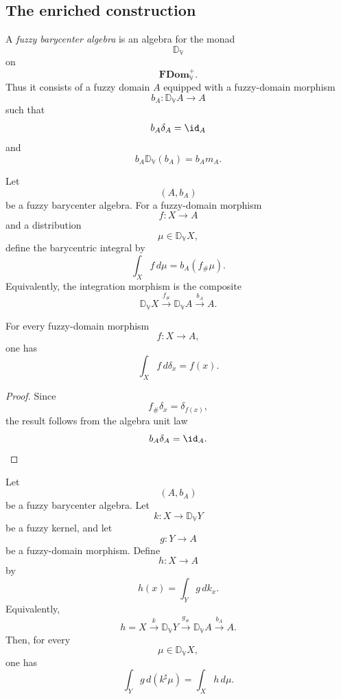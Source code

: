 \subsection{The enriched construction}
\label{subsec:barycenter-enriched}

\begin{definition}
\label{def:fuzzy-barycenter-algebra}
A \emph{fuzzy barycenter algebra} is an algebra for the monad
\[
    \mathbb D_{\mathbb V}
\]
on
\[
    \mathbf{FDom}_{\mathbb V}^{+}.
\]
Thus it consists of a fuzzy domain \(A\) equipped with a fuzzy-domain morphism
\[
    b_A:\mathbb D_{\mathbb V}A\to A
\]
such that
\[
    b_A\delta_A=\id_A
\]
and
\[
    b_A\mathbb D_{\mathbb V}(b_A)=b_A m_A.
\]
\end{definition}

\begin{definition}
\label{def:fuzzy-barycentric-integration}
Let
\[
    (A,b_A)
\]
be a fuzzy barycenter algebra.  For a fuzzy-domain morphism
\[
    f:X\to A
\]
and a distribution
\[
    \mu\in\mathbb D_{\mathbb V}X,
\]
define the barycentric integral by
\[
    \int_X f\,d\mu
    =
    b_A(f_{\#}\mu).
\]
Equivalently, the integration morphism is the composite
\[
    \mathbb D_{\mathbb V}X
    \xrightarrow{f_{\#}}
    \mathbb D_{\mathbb V}A
    \xrightarrow{b_A}
    A.
\]
\end{definition}

\begin{proposition}
\label{prop:fuzzy-barycentric-dirac-law}
For every fuzzy-domain morphism
\[
    f:X\to A,
\]
one has
\[
    \int_X f\,d\delta_x
    =
    f(x).
\]
\end{proposition}

\begin{proof}
Since
\[
    f_{\#}\delta_x=\delta_{f(x)},
\]
the result follows from the algebra unit law
\[
    b_A\delta_A=\id_A.
\]
\end{proof}

\begin{theorem}
\label{thm:fuzzy-barycentric-chain-rule}
Let
\[
    (A,b_A)
\]
be a fuzzy barycenter algebra.  Let
\[
    k:X\to\mathbb D_{\mathbb V}Y
\]
be a fuzzy kernel, and let
\[
    g:Y\to A
\]
be a fuzzy-domain morphism.  Define
\[
    h:X\to A
\]
by
\[
    h(x)=\int_Y g\,dk_x.
\]
Equivalently,
\[
    h
    =
    X
    \xrightarrow{k}
    \mathbb D_{\mathbb V}Y
    \xrightarrow{g_{\#}}
    \mathbb D_{\mathbb V}A
    \xrightarrow{b_A}
    A.
\]
Then, for every
\[
    \mu\in\mathbb D_{\mathbb V}X,
\]
one has
\[
    \int_Y g\,d(k^{\sharp}\mu)
    =
    \int_X h\,d\mu.
\]
\end{theorem}

